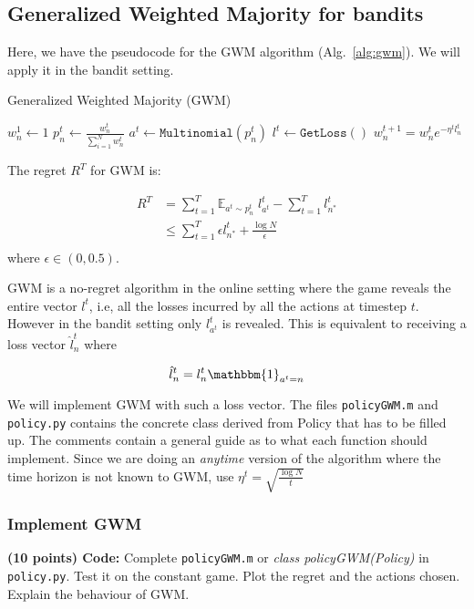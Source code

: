 \documentclass{article}
\newcommand{\E}[1]{\mathbb{E}_{#1}\;}
\newcommand{\Ind}[1]{\mathbbm{1}_{#1}}
\begin{document}
\subsection{Generalized Weighted Majority for bandits}

Here, we have the pseudocode for the GWM algorithm (Alg.~\ref{alg:gwm}). We will apply it in the bandit setting.

\begin{algorithm}
    \label{alg:gwm}
    \caption{Generalized Weighted Majority (GWM)} 
    
    $w^1_n \gets 1$\;
    {
        $p_n^t \gets \frac{w_n^t}{\sum_{i=1}^N w_n^t}$ \;
    	$a^t \gets \mathtt{Multinomial}(p^t_n)$\;
    	$l^t \gets \mathtt{GetLoss}()$\;
    	$w^{t+1}_n = w^t_n e^{-\eta^t l^t_n}$\;
    }
\end{algorithm}

The regret $R^T$ for GWM is:

\begin{equation}
\begin{aligned}
R^{T} 	 	& = \sum\limits_{t=1}^T \E{a^t \sim p^t_n} l^t_{a^t} - \sum\limits_{t=1}^T l^t_{n^*} \\
		 	& \leq \sum\limits_{t=1}^T \epsilon l^t_{n^*} + \frac{\log N}{\epsilon} \\
\end{aligned}
\end{equation}
where $\epsilon \in (0, 0.5)$.

GWM is a no-regret algorithm in the online setting where the game reveals the entire vector $l^t$, i.e, all the losses incurred by all the actions at timestep $t$. However in the bandit setting only $l^t_{a^t}$ is revealed. This is equivalent to receiving a loss vector $\hat{l}^t_n$ where 

\begin{equation}
\hat{l}^t_n = l^t_n \Ind{a^t=n}
\end{equation}


We will implement GWM with such a loss vector. The files \texttt{policyGWM.m} and \texttt{policy.py} contains the concrete class derived from Policy that has to be filled up. The comments contain a general guide as to what each function should implement. Since we are doing an \emph{anytime} version of the algorithm where the time horizon is not known to GWM, use $\eta^t = \sqrt{\frac{\log N}{t}}$

\subsubsection{Implement GWM}
\textbf{(10 points) Code:} Complete \texttt{policyGWM.m} or \textit{class policyGWM(Policy)} in \texttt{policy.py}. Test it on the constant game. Plot the regret and the actions chosen. Explain the behaviour of GWM.\\
\end{document}
